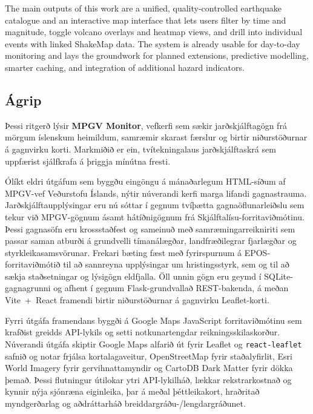 \documentclass[12pt]{article}
\begin{document}
The main outputs of this work are a unified, quality-controlled earthquake catalogue and an interactive map interface that lets users filter by time and magnitude, toggle volcano overlays and heatmap views, and drill into individual events with linked ShakeMap data. The system is already usable for day-to-day monitoring and lays the groundwork for planned extensions, predictive modelling, smarter caching, and integration of additional hazard indicators.

\clearpage
\null
\thispagestyle{empty}
\newpage


\begin{otherlanguage}{icelandic}
\section*{\huge Ágrip}
Þessi ritgerð lýsir \textbf{MPGV Monitor}, vefkerfi sem sækir jarðskjálftagögn frá mörgum íslenskum heimildum, samræmir skarast færslur og birtir niðurstöðurnar á gagnvirku korti. Markmiðið er ein, tvítekningalaus jarðskjálftaskrá sem uppfærist sjálfkrafa á þriggja mínútna fresti.

Ólíkt eldri útgáfum sem byggðu eingöngu á mánaðarlegum HTML-síðum af MPGV-vef Veðurstofu Íslands, nýtir núverandi kerfi marga lifandi gagnastrauma. Jarðskjálftaupplýsingar eru nú sóttar í gegnum tvíþætta gagnaöflunarleiðslu sem tekur við MPGV-gögnum ásamt hátíðnigögnum frá Skjálftalísu-forritaviðmótinu. Þessi gagnasöfn eru krossstaðfest og sameinuð með samræmingarreikniriti sem passar saman atburði á grundvelli tímanálægðar, landfræðilegrar fjarlægðar og styrkleikasamsvörunar. Frekari bæting fæst með fyrirspurnum á EPOS-forritaviðmótið til að sannreyna upplýsingar um hristingsstyrk, sem og til að sækja staðsetningar og lýsigögn eldfjalla. Öll unnin gögn eru geymd í SQLite-gagnagrunni og afhent í gegnum Flask-grundvallað REST-bakenda, á meðan Vite~+~React framendi birtir niðurstöðurnar á gagnvirku Leaflet-korti.

Fyrri útgáfa framendans byggði á Google Maps JavaScript forritaviðmótinu sem krafðist greidds API-lykils og setti notkunartengdar reikningsskilaskorður. Núverandi útgáfa skiptir Google Maps alfarið út fyrir Leaflet og \texttt{react-leaflet} safnið og notar frjálsa kortalagaveitur, OpenStreetMap fyrir staðalyfirlit, Esri World Imagery fyrir gervihnattamyndir og CartoDB Dark Matter fyrir dökka þemað. Þessi flutningur útilokar ytri API-lykilháð, lækkar rekstrarkostnað og kynnir nýja sjónræna eiginleika, þar á meðal þéttleikakort, hraðritað myndgerðarlag og aðdráttarháð breiddargráðu-/lengdargráðunet.


\end{otherlanguage}
\end{document}

